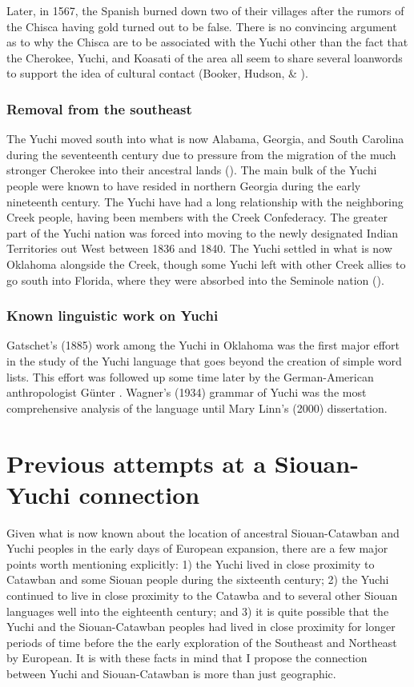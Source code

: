 \documentclass[output=paper]{LSP/langsci}
\begin{document}
Later, in 1567, the Spanish burned down two of their villages after the rumors of the Chisca having gold turned out to be false. There is no convincing argument as to why the Chisca are to be associated with the Yuchi other than the fact that the Cherokee, Yuchi, and Koasati of the area all seem to share several loanwords to support the idea of cultural contact (Booker, Hudson, \& \citealt{Rankin1992}).

\subsubsection{Removal from the southeast} 

The Yuchi moved south into what is now Alabama, Georgia, and South Carolina during the seventeenth century due to pressure from the migration of the much stronger Cherokee into their ancestral lands (\citealt{Jackson2012}). The main bulk of the Yuchi people were known to have resided in northern Georgia during the early nineteenth century. The Yuchi have had a long relationship with the neighboring Creek people, having been members with the Creek Confederacy. The greater part of the Yuchi nation was forced into moving to the newly designated Indian Territories out West between 1836 and 1840. The Yuchi settled in what is now Oklahoma alongside the Creek, though some Yuchi left with other Creek allies to go south into Florida, where they were absorbed into the Seminole nation (\citealt{Mithun1999}).

\subsubsection{Known linguistic work on Yuchi} 

Gatschet's (1885) work among the Yuchi in Oklahoma was the first major effort in the study of the Yuchi language that goes beyond the creation of simple word lists. This effort was followed up some time later by the German-American anthropologist G\"unter \citet{Wagner1934}. Wagner's (1934) grammar of Yuchi was the most comprehensive analysis of the language until Mary Linn's (2000) dissertation.

\section{Previous attempts at a Siouan-Yuchi connection}

Given what is now known about the location of ancestral Siouan-Catawban and Yuchi peoples in the early days of European expansion, there are a few major points worth mentioning explicitly: 1) the Yuchi lived in close proximity to Catawban and some Siouan people during the sixteenth century; 2) the Yuchi continued to live in close proximity to the Catawba and to several other Siouan languages well into the eighteenth century; and 3) it is quite possible that the Yuchi and the Siouan-Catawban peoples had lived in close proximity for longer periods of time before the the early exploration of the Southeast and Northeast by European. It is with these facts in mind that I propose the connection between Yuchi and Siouan-Catawban is more than just geographic.
\end{document}
